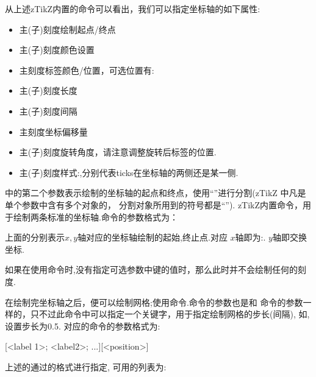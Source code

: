 从上述zTikZ内置的\cmd{\xAxis}\index{\cmd{\xAxis}}命令可以看出，我们可以指定坐标轴的如下属性:
\begin{itemize}
    \item 主(子)刻度绘制起点/终点
    \item 主(子)刻度颜色设置
    \item 主刻度标签颜色/位置，可选位置有:
    \item 主(子)刻度长度
    \item 主(子)刻度间隔
    \item 主刻度坐标偏移量
    \item 主(子)刻度旋转角度，请注意调整旋转后标签的位置.
    \item 主(子)刻度样式:,分别代表ticks在坐标轴的两侧还是某一侧.
\end{itemize}

\cmd{\ShowAxis}中的第二个参数表示绘制的坐标轴的起点和终点，使用``\cmd{;}''进行分割(zTikZ 中凡是单个参数中含有多个对象的，
分割对象所用到的符号都是``\cmd{;}''). zTikZ内置\cmd{\xAxis,\yAxis}\index{\cmd{\yAxis}}命令，用于绘制两条标准的坐标轴.命令的参数格式为：
\begin{codeprint}
\xAxis[<start>][<end>]
\yAxis[<start>][<end>]
\end{codeprint}

上面的分别表示$x,y$轴对应的坐标轴绘制的起始,终止点.对应 $x$轴即为:.
$y$轴即交换坐标.

\begin{remark}
    如果在使用\cmd{\ShowAxis}命令时,没有指定可选参数中键的值时，那么此时并不会绘制任何的刻度.
\end{remark}

在绘制完坐标轴之后，便可以绘制网格;使用\cmd{\ShowGrid}命令.\cmd{\ShowGrid}\index{\cmd{\ShowGrid}}命令的参数也是和\cmd{\ShowAxis}
命令的参数一样的，只不过此命令中可以指定一个关键字，用于指定绘制网格的步长(间隔), 如,设置步长为0.5. 
对应的\cmd{\ShowPoint}\index{\cmd{\ShowPoint}}命令的参数格式为:

\begin{codeprint}
[<label 1>; <label2>; ...][<position>]
\end{codeprint}

上述的通过的格式进行指定, 可用的列表为:

